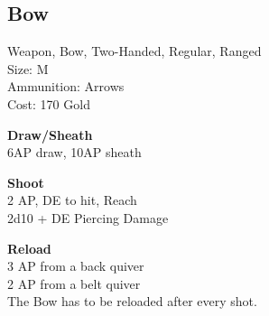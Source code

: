 \subsection{Bow}\label{weapon:bow}
Weapon, Bow, Two-Handed, Regular, Ranged\\
Size: M\\
Ammunition: Arrows\\
Cost: 170 Gold

\textbf{Draw/Sheath}\\
6AP draw, 10AP sheath

\textbf{Shoot}\\
2 AP, DE to hit,  Reach\\
2d10 + \texttimes DE Piercing Damage

\textbf{Reload}\\
3 AP from a back quiver\\
2 AP from a belt quiver\\
The Bow has to be reloaded after every shot.